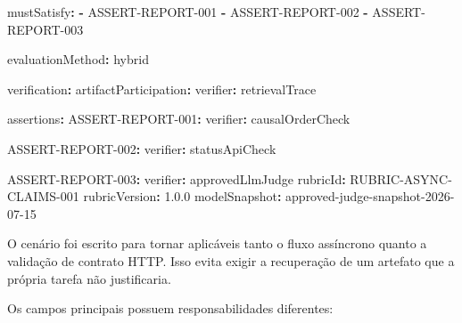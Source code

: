 \documentclass[
  10pt,
  a4paper,
  oneside]{book}
\newenvironment{Shaded}{}{}
\newcommand{\AttributeTok}[1]{\textcolor[rgb]{0.49,0.56,0.16}{#1}}
\newcommand{\FloatTok}[1]{\textcolor[rgb]{0.25,0.63,0.44}{#1}}
\newcommand{\FunctionTok}[1]{\textcolor[rgb]{0.02,0.16,0.49}{#1}}
\newcommand{\KeywordTok}[1]{\textcolor[rgb]{0.00,0.44,0.13}{\textbf{#1}}}
\renewenvironment{Shaded}{\begin{snugshade}}{\end{snugshade}}%
\begin{document}
\begin{Shaded}
\begin{Highlighting}[]
\AttributeTok{  }\FunctionTok{mustSatisfy}\KeywordTok{:}
\AttributeTok{    }\KeywordTok{{-}}\AttributeTok{ ASSERT{-}REPORT{-}001}
\AttributeTok{    }\KeywordTok{{-}}\AttributeTok{ ASSERT{-}REPORT{-}002}
\AttributeTok{    }\KeywordTok{{-}}\AttributeTok{ ASSERT{-}REPORT{-}003}

\FunctionTok{evaluationMethod}\KeywordTok{:}\AttributeTok{ hybrid}

\FunctionTok{verification}\KeywordTok{:}
\AttributeTok{  }\FunctionTok{artifactParticipation}\KeywordTok{:}
\AttributeTok{    }\FunctionTok{verifier}\KeywordTok{:}\AttributeTok{ retrievalTrace}

\AttributeTok{  }\FunctionTok{assertions}\KeywordTok{:}
\AttributeTok{    }\FunctionTok{ASSERT{-}REPORT{-}001}\KeywordTok{:}
\AttributeTok{      }\FunctionTok{verifier}\KeywordTok{:}\AttributeTok{ causalOrderCheck}

\AttributeTok{    }\FunctionTok{ASSERT{-}REPORT{-}002}\KeywordTok{:}
\AttributeTok{      }\FunctionTok{verifier}\KeywordTok{:}\AttributeTok{ statusApiCheck}

\AttributeTok{    }\FunctionTok{ASSERT{-}REPORT{-}003}\KeywordTok{:}
\AttributeTok{      }\FunctionTok{verifier}\KeywordTok{:}\AttributeTok{ approvedLlmJudge}
\AttributeTok{      }\FunctionTok{rubricId}\KeywordTok{:}\AttributeTok{ RUBRIC{-}ASYNC{-}CLAIMS{-}001}
\AttributeTok{      }\FunctionTok{rubricVersion}\KeywordTok{:}\AttributeTok{ }\FloatTok{1.0.0}
\AttributeTok{      }\FunctionTok{modelSnapshot}\KeywordTok{:}\AttributeTok{ approved{-}judge{-}snapshot{-}2026{-}07{-}15}
\end{Highlighting}
\end{Shaded}

O cenário foi escrito para tornar aplicáveis tanto o fluxo assíncrono
quanto a validação de contrato HTTP. Isso evita exigir a recuperação de
um artefato que a própria tarefa não justificaria.

Os campos principais possuem responsabilidades diferentes:
\end{document}
